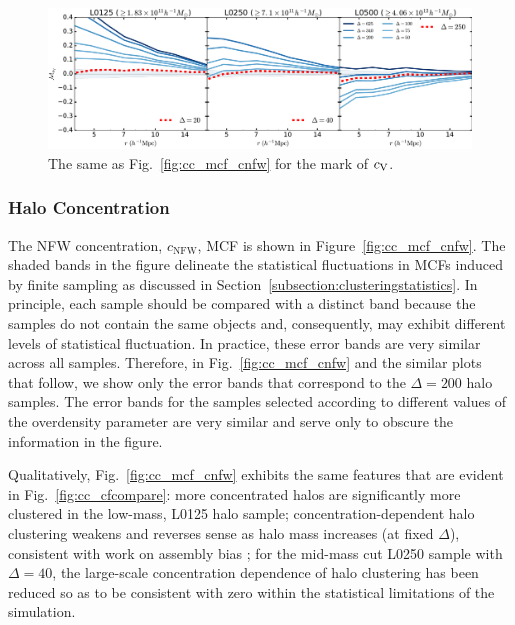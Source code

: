 \documentclass[usenatbib,fleqn]{mnras}
\begin{document}
\begin{figure}
	\centering
	\includegraphics[width=\textwidth]{all_mcf_cV.pdf}
	\caption{	
The same as Fig.~\ref{fig:cc_mcf_cnfw} for the mark of $c_{\rm V}$.
}
	\label{fig:cc_mcf_cV}
\end{figure}



\subsubsection{Halo Concentration}

The NFW concentration, $c_{\mathrm{NFW}}$, MCF is shown in Figure~\ref{fig:cc_mcf_cnfw}. The shaded bands in the figure delineate the statistical fluctuations in MCFs induced by finite sampling as discussed in Section~\ref{subsection:clusteringstatistics}. In principle, each sample should be compared with a distinct band because the samples do not contain the same objects and, consequently, may exhibit different levels of statistical fluctuation. In practice, these error bands are very similar across all samples. Therefore, in Fig.~\ref{fig:cc_mcf_cnfw} and the similar plots that follow, we show only the error bands that correspond to the $\Delta=200$ halo samples. The error bands for the samples selected according to different values of the overdensity parameter are very similar and serve only to obscure the information in the figure. 

Qualitatively, Fig.~\ref{fig:cc_mcf_cnfw} exhibits the same features that are evident in Fig.~\ref{fig:cc_cfcompare}: more concentrated halos are significantly more clustered in the low-mass, L0125 halo sample; concentration-dependent halo clustering weakens and reverses sense as halo mass increases (at fixed $\Delta$), consistent with work on assembly bias \citep{wechsler_etal06,sunayama_etal16}; for the mid-mass cut L0250 sample with $\Delta=40$, the large-scale concentration dependence of halo clustering has been reduced so as to be consistent with zero within the statistical limitations of the simulation. 
\end{document}
